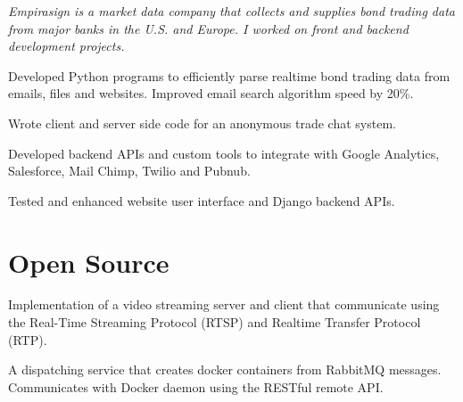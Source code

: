 \documentclass[letterpaper]{deedy-resume} %
\begin{document}
\begin{minipage}[t]{0.66\textwidth}
\sectionspace %


\textit{Empirasign is a market data company that collects and supplies bond trading data from major banks in the U.S. and Europe. I worked on front and backend development projects.}
\vspace{0.75mm}
\begin{tightitemize}
\item Developed Python programs to efficiently parse realtime bond trading data from emails, files and websites. Improved email search algorithm speed by 20\%.
\item Wrote client and server side code for an anonymous trade chat system.
\item Developed backend APIs and custom tools to integrate with Google Analytics, Salesforce, Mail Chimp, Twilio and Pubnub.
\item Tested and enhanced website user interface and Django backend APIs.
\end{tightitemize}

\sectionspace %


\section{Open Source}

Implementation of a video streaming server and client that communicate using the Real-Time Streaming Protocol (RTSP) and Realtime Transfer Protocol (RTP).

\sectionspace %

A dispatching service that creates docker containers from RabbitMQ messages. Communicates with Docker daemon using the RESTful remote API.




\end{minipage} %
\end{document}
